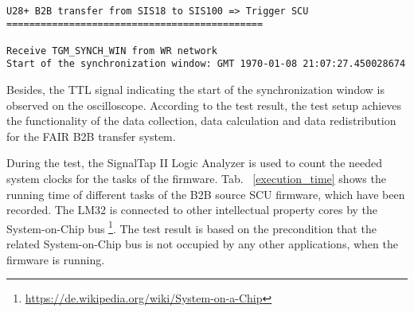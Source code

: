 \begin{lstlisting}[language={[ANSI]C}, keywordstyle=\color{blue!70}, commentstyle=\color{red!50!green!50!blue!50}, frame=shadowbox, rulesepcolor=\color{red!20!green!20!blue!20}]

U28+ B2B transfer from SIS18 to SIS100 => Trigger SCU
=============================================

Receive TGM_SYNCH_WIN from WR network
Start of the synchronization window: GMT 1970-01-08 21:07:27.450028674
\end{lstlisting}

Besides, the TTL signal indicating the start of the synchronization window is observed on the oscilloscope. According to the test result, the test setup achieves the functionality of the data collection, data calculation and data redistribution for the FAIR B2B transfer system.


During the test, the SignalTap II Logic Analyzer is used to count the needed system clocks for the tasks of the firmware. Tab. ~\ref{execution_time} shows the running time of different tasks of the B2B source SCU firmware, which have been recorded. The LM32 is connected to other intellectual property cores by the System-on-Chip bus \footnote{\url{https://de.wikipedia.org/wiki/System-on-a-Chip}}. The test result is based on the precondition that the related System-on-Chip bus is not occupied by any other applications, when the firmware is running.

